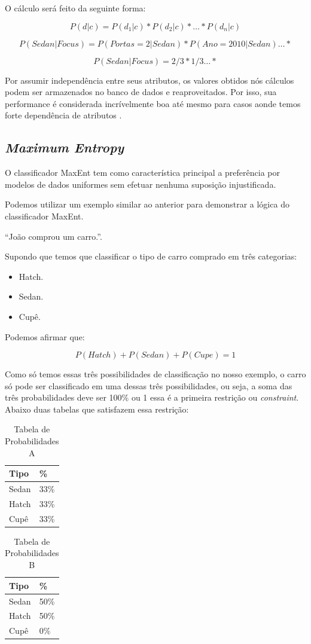 O cálculo será feito da seguinte forma:

\[ P(d|c) = P(d_1|c) * P(d_2|c)* \ldots * P(d_n|c) \]

\[ P(Sedan|Focus) = P(Portas=2|Sedan) * P(Ano=2010|Sedan) \ldots * \]

\[ P(Sedan|Focus) = 2/3 * 1/3 \ldots * \]

Por assumir independência entre seus atributos, os valores obtidos nós cálculos
podem ser armazenados no banco de dados e reaproveitados. Por isso, sua
performance é considerada incrívelmente boa até mesmo para casos aonde temos forte dependência de
atributos \cite{domingos97naivebayes}.

\subsection{\textit{Maximum Entropy}}
O classificador \ac{MaxEnt} tem como
característica principal a preferência por modelos de dados uniformes sem efetuar nenhuma suposição injustificada.

Podemos utilizar um exemplo similar ao anterior para demonstrar a lógica do
classificador \ac{MaxEnt}. 
 
``João comprou um carro.''.

Supondo que temos que classificar o tipo de carro comprado em três categorias:

\begin{itemize}
  \item Hatch.
  \item Sedan.
  \item Cupê.
\end{itemize}

Podemos afirmar que:

\[ P(Hatch) + P (Sedan) + P(Cupe) = 1 \]

Como só temos essas três possibilidades de classificação no nosso
exemplo, o carro só pode ser classificado em uma dessas três possibilidades, ou
seja, a soma das três probabilidades deve ser 100\% ou 1 essa é a primeira
restrição ou \textit{constraint}. Abaixo duas tabelas que satisfazem essa
restrição:

\begin{table}[htb]
\centering
\begin{tabular}{|l|l|}
\hline
Tipo  & \%   \\ \hline
Sedan & 33\% \\ \hline
Hatch & 33\% \\ \hline
Cupê  & 33\% \\ \hline
 \end{tabular}
\caption{Tabela de Probabilidades A} 
\end{table}
\begin{table}[htb]
\centering
 \begin{tabular}{|l|l|}
\hline
Tipo  & \%   \\ \hline
Sedan & 50\% \\ \hline
Hatch & 50\% \\ \hline
Cupê  & 0\% \\ \hline
 \end{tabular}  
\caption{Tabela de Probabilidades B} 
\end{table}

